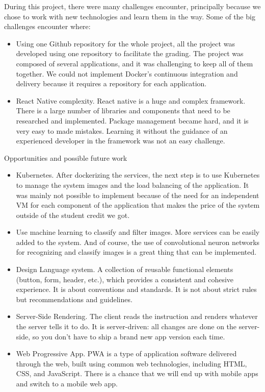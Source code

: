 During this project, there were many challenges encounter, principally because we chose to work with new technologies and learn them in the way. Some of the big challenges encounter where:

\begin{itemize}
	

\item Using one Github repository for the whole project, all the project was developed using one repository to facilitate the grading. The project was composed of several applications, and it was challenging to keep all of them together. We could not implement Docker's continuous integration and delivery because it requires a  repository for each application.

\item  React Native complexity. React native is a huge and complex framework. There is a large number of libraries and components that need to be researched and implemented. Package management became hard, and it is very easy to made mistakes. Learning it without the guidance of an experienced developer in the framework was not an easy challenge. 
\end{itemize}

Opportunities and possible future work

\begin{itemize}


	\item  Kubernetes. After dockerizing the services, the next step is to use Kubernetes to manage the system images and the load balancing of the application. It was mainly not possible to implement because of the need for an independent VM for each component of the application that makes the price of the system outside of the student credit we got.

	\item  Use machine learning to classify and filter images. More services can be easily added to the system. And of course, the use of convolutional neuron networks for recognizing and classify images is a great thing that can be implemented.

	\item  Design Language system. A collection of reusable functional elements (button, form, header, etc.), which provides a consistent and cohesive experience. It is about conventions and standards. It is not about strict rules but recommendations and guidelines.

	\item  Server-Side Rendering. The client reads the instruction and renders whatever the server tells it to do. It is server-driven: all changes are done on the server-side, so you don't have to ship a brand new app version each time.

	\item  Web Progressive App. PWA is a type of application software delivered through the web, built using common web technologies, including HTML, CSS, and JavaScript. There is a chance that we will end up with mobile apps and switch to a mobile web app.
\end{itemize}

